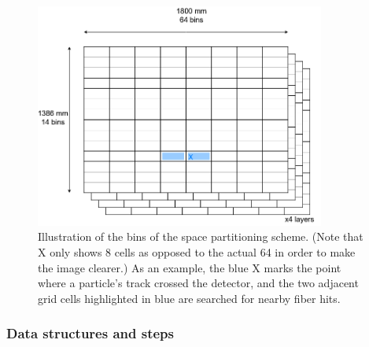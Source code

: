 \documentclass[12pt]{article}
\begin{document}
\begin{figure}[H]
	\begin{center}
		\includegraphics[width=0.85\textwidth]{velout_space_partitioning}
	\end{center}
	\caption[Uniform grid space partitioning]{Illustration of the bins of the space partitioning scheme. (Note that X only shows 8 cells as opposed to the actual 64 in order to make the image clearer.) As an example, the blue X marks the point where a particle's track crossed the detector, and the two adjacent grid cells highlighted in blue are searched for nearby fiber hits.}
	\label{fig_velout_space_partitioning}
\end{figure}


\subsubsection{Data structures and steps}
\end{document}
